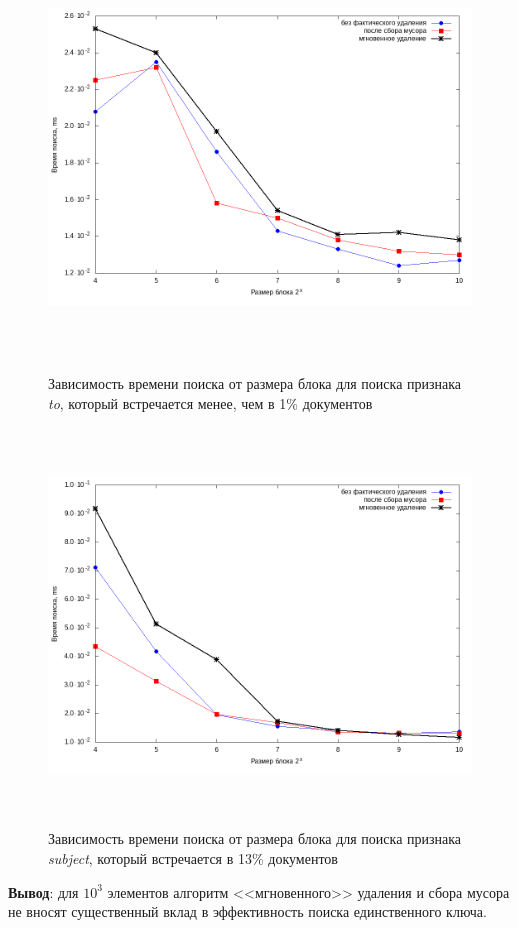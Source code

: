\begin{figure}[H]
\includegraphics[width=\linewidth, height=10.5cm]{fig/limit_1/1e3/to.png}
\caption{Зависимость времени поиска от размера блока для поиска признака \textit{to}, который встречается менее, чем в 1\% документов}
\includegraphics[width=\linewidth, height=10.51cm]{fig/limit_1/1e3/subject.png}
\caption{Зависимость времени поиска от размера блока для поиска признака \textit{subject}, который встречается в 13\% документов}
\end{figure}

\textbf{Вывод}: для $10^3$ элементов алгоритм <<мгновенного>> удаления и сбора мусора
не вносят существенный вклад в эффективность поиска единственного ключа.

